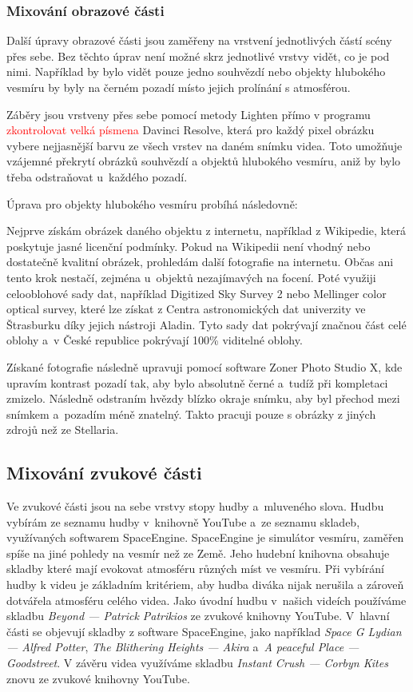 \documentclass[12pt,a4paper,titlepage]{article}
\begin{document}
\subsubsection{Mixování obrazové části}
Další úpravy obrazové části jsou zaměřeny na vrstvení jednotlivých částí scény přes sebe. Bez těchto úprav není možné skrz jednotlivé vrstvy vidět, co je pod nimi. Například by bylo vidět pouze jedno souhvězdí nebo objekty hlubokého vesmíru by byly na černém pozadí místo jejich prolínání s atmosférou.

Záběry jsou vrstveny přes sebe pomocí metody Lighten přímo v programu \textcolor{red}{zkontrolovat velká písmena} Davinci Resolve, která pro každý pixel obrázku vybere nejjasnější barvu ze všech vrstev na daném snímku videa. Toto umožňuje vzájemné překrytí obrázků souhvězdí a objektů hlubokého vesmíru, aniž by bylo třeba odstraňovat u~každého pozadí. 

Úprava pro objekty hlubokého vesmíru probíhá následovně:

Nejprve získám obrázek daného objektu z internetu, například z Wikipedie, která poskytuje jasné licenční podmínky. Pokud na Wikipedii není vhodný nebo dostatečně kvalitní obrázek, prohledám další fotografie na internetu. Občas ani tento krok nestačí, zejména u~objektů nezajímavých na focení. Poté využiji celooblohové sady dat, například Digitized Sky Survey 2 nebo Mellinger color optical survey, které lze získat z Centra astronomických dat univerzity ve Štrasburku díky jejich nástroji Aladin. Tyto sady dat pokrývají značnou část celé oblohy a~v České republice pokrývají 100\% viditelné oblohy. 

Získané fotografie následně upravuji pomocí software Zoner Photo Studio X, kde upravím kontrast pozadí tak, aby bylo absolutně černé a~tudíž při kompletaci zmizelo. Následně odstraním hvězdy blízko okraje snímku, aby byl přechod mezi snímkem a~pozadím méně znatelný. Takto pracuji pouze s obrázky z jiných zdrojů než ze Stellaria.
\subsection{Mixování zvukové části}
Ve zvukové části jsou na sebe vrstvy stopy hudby a~mluveného slova. Hudbu vybírám ze seznamu hudby v~knihovně YouTube a~ze seznamu skladeb, využívaných softwarem SpaceEngine. SpaceEngine je simulátor vesmíru, zaměřen spíše na jiné pohledy na vesmír než ze Země. Jeho hudební knihovna obsahuje skladby které mají evokovat atmosféru různých míst ve vesmíru. Při vybírání hudby k videu je základním kritériem, aby hudba diváka nijak nerušila a zároveň dotvářela atmosféru celého videa. Jako úvodní hudbu v~našich videích používáme skladbu \textit{Beyond --- Patrick Patrikios} ze zvukové knihovny YouTube. V~hlavní části se objevují skladby z software SpaceEngine, jako například \textit{Space G Lydian --- Alfred Potter}, \textit{The Blithering Heights --- Akira} a~\textit{A peaceful Place --- Goodstreet}. V závěru videa využíváme skladbu \textit{Instant Crush --- Corbyn Kites} znovu ze zvukové knihovny YouTube.
\end{document}
